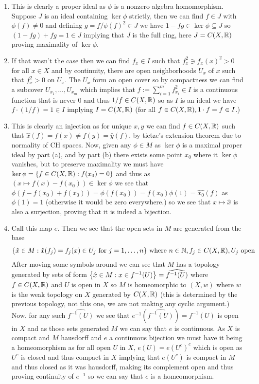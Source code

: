 \documentclass[12pt,a4paper]{article}
\begin{document}
\begin{solution}
\begin{enumerate}[label=\alph*.]
    \item This is clearly a proper ideal as $\phi$ is a nonzero algebra homomorphism. 
        Suppose $J$ is an ideal containing $\ker\phi$ strictly, then we can find $f\in J$ with $\phi(f)\neq 0$ and defining $g=f/\phi(f)^2\in J$ we have $1-fg\in\ker\phi \subseteq J$ so $(1-fg)+fg=1\in J$ implying that $J$ is the full ring, here $J=C(X,\mathbb{R})$ proving maximality of $\ker\phi.$ 
    \item If that wasn't the case then we can find $f_x\in I$ such that $f_x^2\ni f_x(x)^2>0$ for all $x\in X$ and by continuity, there are open neighborhoods $U_x$ of $x$ such that $f_x^2>0$ on $U_x.$ 
        The $U_x$ form an open cover so by compactness we can find a subcover $U_{x_1},\ldots,U_{x_m}$ which implies that $f:=\sum_{i=1}^mf_{x_i}^2\in I$ is a continuous function that is never $0$ and thus $1/f\in C(X,\mathbb{R})$ so as $I$ is an ideal we have $f\cdot(1/f)=1\in I$ implying $I= C(X,\mathbb{R})$ (for all $f\in C(X,\mathbb{R}),1\cdot f=f\in I$.) 
    \item This is clearly an injection as for unique $x,y$ we can find $f\in C(X,\mathbb{R})$ such that $\hat{x}(f)=f(x)\neq f(y)=\hat{y}(f)$, by tietze's extension theorem due to normality of CH spaces. 
        Now, given any $\phi\in M$ as $\ker\phi$ is a maximal proper ideal by part (a), and by part (b) there exists some point $x_0$ where it $\ker\phi$ vanishes, but to preserve maximality we must have $\ker\phi= \qty{f\in C(X,\mathbb{R}):f(x_0)=0}$ and thus as $(x\mapsto f(x)-f(x_0))\in\ker\phi$ we see that $\phi(f-f(x_0)+f(x_0))=\phi(f(x_0))=f(x_0)\phi(1)=\hat{x_0}(f)$ as $\phi(1)=1$ (otherwise it would be zero everywhere.) so we see that $x\mapsto\hat{x}$ is also a surjection, proving that it is indeed a bijection.  
    \item Call this map $e$. 
        Then we see that the open sets in $M$ are generated from the base
        \[
            \qty{\hat{x}\in M:\hat{x}(f_j)=f_j(x)\in U_j\text{ for }j=1,\ldots,n}\text{ where } n\in\mathbb{N},f_j\in C(X,\mathbb{R}),U_j\text{ open}
        \]
        After moving some symbols around we can see that $M$ has a topology generated by sets of form $ \qty{\hat{x}\in M:x\in f^{-1}(U)}=\widehat{f^{-1}(U)}$ where $f\in C(X,\mathbb{R})$ and $U$ is open in $X$ so $M$ is homeomorphic to $(X,w)$ where $w$ is the weak topology on $X$ generated by $C(X,\mathbb{R})$ (this is determined by the previous topology, not this one, we are not making any cyclic argument.) 
        Now, for any such $\widehat{f^{-1}(U)}$ we see that $e^{-1}(\widehat{f^{-1}(U)})=f^{-1}(U)$ is open in $X$ and as those sets generated $M$ we can say that $e$ is continuous. 
        As $X$ is compact and $M$ hausdorff and $e$ a continuous bijection we must have it being a homeomorphism as for all open $U$ in $X$, $e(U)=e(U^c)^c$ which is open as $U^c$ is closed and thus compact in $X$ implying that $e(U^c)$ is compact in $M$ and thus closed as it was hausdorff, making its complement open and thus proving continuity of $e^{-1}$ so we can say that $e$ is a homeomorphism. 
\end{enumerate}
\end{solution}
\end{document}
